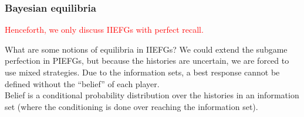 	\subsubsection{Bayesian equilibria}

		\textcolor{red}{Henceforth, we only discuss IIEFGs with perfect recall.}
		
		What are some notions of equilibria in IIEFGs? We could extend the subgame perfection in PIEFGs, but because the histories are uncertain, we are forced to use mixed strategies. Due to the information sets, a best response cannot be defined without the ``belief'' of each player.\\
		Belief is a conditional probability distribution over the histories in an information set (where the conditioning is done over reaching the information set).

